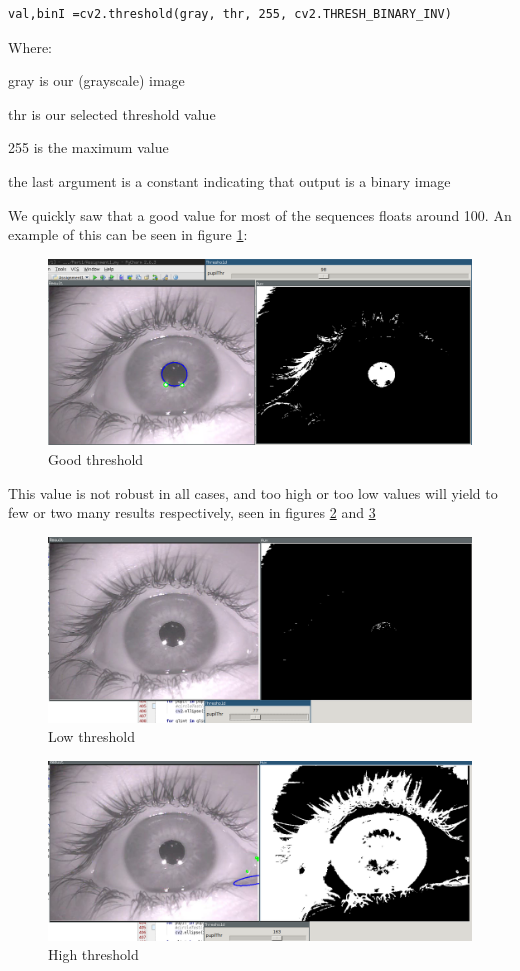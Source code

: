 \begin{verbatim}
val,binI =cv2.threshold(gray, thr, 255, cv2.THRESH_BINARY_INV)
\end{verbatim}
Where:

gray is our (grayscale) image

thr is our selected threshold value

255 is the maximum value

the last argument is a constant indicating that output is a binary image

We quickly saw that a good value for most of the sequences floats around
100. An example of this can be seen in figure \ref{goodthr}:

\begin{figure}[htbp]
\centering
\includegraphics{pics/threshold_good.png}
\caption{Good threshold \label{goodthr}}
\end{figure}

This value is not robust in all cases, and too high or too low values will
yield to few or two many results respectively, seen in figures
\ref{lowthr} and \ref{highthr}

\begin{figure}[htbp]
\centering
\includegraphics{pics/threshold_low.png}
\caption{Low threshold \label{lowthr}}
\end{figure}

\begin{figure}[htbp]
\centering
\includegraphics{pics/threshold_high.png}
\caption{High threshold \label{highthr}}
\end{figure}

